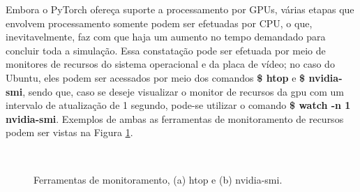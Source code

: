 Embora o PyTorch ofereça suporte a processamento por GPUs, várias etapas que envolvem processamento somente podem ser efetuadas por CPU, o que, inevitavelmente, faz com que haja um aumento no tempo demandado para concluir toda a simulação. Essa constatação pode ser efetuada por meio de monitores de recursos do sistema operacional e da placa de vídeo; no caso do Ubuntu, eles podem ser acessados por meio dos comandos \textbf{\$ htop} e \textbf{\$ nvidia-smi}, sendo que, caso se deseje visualizar o monitor de recursos da gpu com um intervalo de atualização de 1 segundo, pode-se utilizar o comando \textbf{\$ watch -n 1 nvidia-smi}. Exemplos de ambas as ferramentas de monitoramento de recursos podem ser vistas na Figura \ref{fig:results_resources_monitoring_tools}.

\begin{figure}[H]
    \centering
    \\
    \vspace{0.5cm}
    \caption{Ferramentas de monitoramento, (a) htop e (b) nvidia-smi.}
    \label{fig:results_resources_monitoring_tools}
\end{figure}

